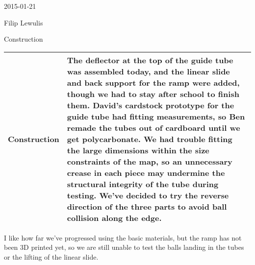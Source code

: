 2015-01-21

Filip Lewulis

Construction

\begin{tabular}{|p{5cm}|p{5cm}|}
\hline Construction &
The deflector at the top of the guide tube was assembled today, and the linear slide and back support for the ramp were added, though we had to stay after school to finish them. David's cardstock prototype for the guide tube had fitting measurements, so Ben remade the tubes out of cardboard until we get polycarbonate. We had trouble fitting the large dimensions within the size constraints of the map, so an unnecessary crease in each piece may undermine the structural integrity of the tube during testing. We've decided to try the reverse direction of the three parts to avoid ball collision along the edge. \\
\hline
\end{tabular}

I like how far we've progressed using the basic materials, but the ramp has not been 3D printed yet, so we are still unable to test the balls landing in the tubes or the lifting of the linear slide.
